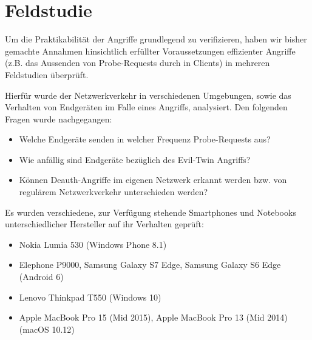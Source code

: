 \section{Feldstudie}
Um die Praktikabilität der Angriffe grundlegend zu verifizieren, haben wir bisher gemachte Annahmen hinsichtlich erfüllter Voraussetzungen effizienter Angriffe (z.B. das Aussenden von Probe-Requests durch in Clients) in mehreren Feldstudien überprüft.

Hierfür wurde der Netzwerkverkehr in verschiedenen Umgebungen, sowie das Verhalten von Endgeräten im Falle eines Angriffs, analysiert.
Den folgenden Fragen wurde nachgegangen:
\begin{itemize}
	\item Welche Endgeräte senden in welcher Frequenz Probe-Requests aus?
	\item Wie anfällig sind Endgeräte bezüglich des Evil-Twin Angriffs?
	\item Können Deauth-Angriffe im eigenen Netzwerk erkannt werden bzw. von regulärem Netzwerkverkehr unterschieden werden?
\end{itemize}

Es wurden verschiedene, zur Verfügung stehende Smartphones und Notebooks unterschiedlicher Hersteller auf ihr Verhalten geprüft:
\begin{itemize}
	\item Nokia Lumia 530 (Windows Phone 8.1)
	\item Elephone P9000, Samsung Galaxy S7 Edge, Samsung Galaxy S6 Edge (Android 6)
	\item Lenovo Thinkpad T550 (Windows 10)
	\item Apple MacBook Pro 15 (Mid 2015), Apple MacBook Pro 13 (Mid 2014) (macOS 10.12)
\end{itemize}

